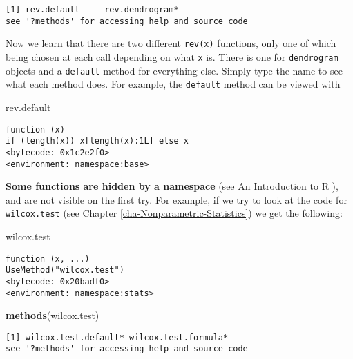 \documentclass[]{book}
\newenvironment{Shaded}{\begin{snugshade}}{\end{snugshade}}
\newcommand{\KeywordTok}[1]{\textcolor[rgb]{0.13,0.29,0.53}{\textbf{{#1}}}}
\newcommand{\NormalTok}[1]{{#1}}
\numberwithin{equation}{chapter}
\numberwithin{figure}{chapter}
\theoremstyle{plain}
\theoremstyle{definition}
\theoremstyle{remark}
\theoremstyle{definition}
\theoremstyle{definition}
\theoremstyle{remark}
\begin{document}
\begin{verbatim}
[1] rev.default     rev.dendrogram*
see '?methods' for accessing help and source code
\end{verbatim}

Now we learn that there are two different \texttt{rev(x)} functions,
only one of which being chosen at each call depending on what \texttt{x}
is. There is one for \texttt{dendrogram} objects and a \texttt{default}
method for everything else. Simply type the name to see what each method
does. For example, the \texttt{default} method can be viewed with

\begin{Shaded}
\begin{Highlighting}[]
\NormalTok{rev.default}
\end{Highlighting}
\end{Shaded}

\begin{verbatim}
function (x) 
if (length(x)) x[length(x):1L] else x
<bytecode: 0x1c2e2f0>
<environment: namespace:base>
\end{verbatim}

\textbf{Some functions are hidden by a namespace} (see An Introduction
to R \textcite{Venables2010}), and are not visible on the first try. For
example, if we try to look at the code for \texttt{wilcox.test}
 (see Chapter
\ref{cha-Nonparametric-Statistics}) we get the following:

\begin{Shaded}
\begin{Highlighting}[]
\NormalTok{wilcox.test}
\end{Highlighting}
\end{Shaded}

\begin{verbatim}
function (x, ...) 
UseMethod("wilcox.test")
<bytecode: 0x20badf0>
<environment: namespace:stats>
\end{verbatim}

\begin{Shaded}
\begin{Highlighting}[]
\KeywordTok{methods}\NormalTok{(wilcox.test)}
\end{Highlighting}
\end{Shaded}

\begin{verbatim}
[1] wilcox.test.default* wilcox.test.formula*
see '?methods' for accessing help and source code
\end{verbatim}
\end{document}

